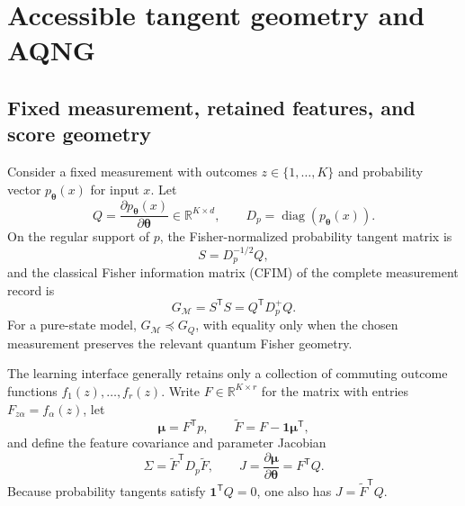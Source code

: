 \section{Accessible tangent geometry and AQNG}
\subsection{Fixed measurement, retained features, and score geometry}
Consider a fixed measurement with outcomes $z\in\{1,\ldots,K\}$ and probability vector $p_{\bm\theta}(x)$ for input $x$. Let
\begin{equation}
 Q=\frac{\partial p_{\bm\theta}(x)}{\partial\bm\theta}\in\mathbb R^{K\times d},
 \qquad D_p=\operatorname{diag}(p_{\bm\theta}(x)).
\end{equation}
On the regular support of $p$, the Fisher-normalized probability tangent matrix is
\begin{equation}
 S=D_p^{-1/2}Q,
\end{equation}
and the classical Fisher information matrix (CFIM) of the complete measurement record is
\begin{equation}
 G_{\mathcal M}=S^{\mathsf T}S=Q^{\mathsf T}D_p^{+}Q.
 \label{eq:measurement_cfim}
\end{equation}
For a pure-state model, $G_{\mathcal M}\preceq G_Q$, with equality only when the chosen measurement preserves the relevant quantum Fisher geometry.

The learning interface generally retains only a collection of commuting outcome functions $f_1(z),\ldots,f_r(z)$. Write $F\in\mathbb R^{K\times r}$ for the matrix with entries $F_{z\alpha}=f_\alpha(z)$, let
\begin{equation}
 \bm\mu=F^{\mathsf T}p,
 \qquad
 \widetilde F=F-\bm 1\bm\mu^{\mathsf T},
\end{equation}
and define the feature covariance and parameter Jacobian
\begin{equation}
 \Sigma=\widetilde F^{\mathsf T}D_p\widetilde F,
 \qquad
 J=\frac{\partial\bm\mu}{\partial\bm\theta}=F^{\mathsf T}Q.
 \label{eq:feature_jac_cov}
\end{equation}
Because probability tangents satisfy $\bm 1^{\mathsf T}Q=0$, one also has $J=\widetilde F^{\mathsf T}Q$.

